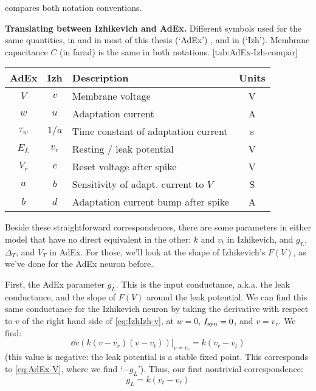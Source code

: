  compares both notation conventions.

\begin{table}[h]
    \begin{sidecaption}
        {\textbf{Translating between Izhikevich and AdEx.}
        Different symbols used for the same quantities, in \cite{Brette2005AdaptiveExponentialIntegrateandFirea} and in most of this thesis (`AdEx') , and in \cite{Izhikevich2007DynamicalSystemsNeuroscience} (`Izh').
        Membrane capacitance $C$ (in farad) is the same in both notations.}
        [tab:AdEx-Izh-compar]
        \begin{tabular}{c c l c}
            AdEx   & Izh  & Description & Units \\
            \hline
            $V$  & $v$   & Membrane voltage & V \\
            $w$  & $u$   & Adaptation current & A \\
            $τ_w$  & $1/a$   & Time constant of adaptation current & s \\
            $E_L$  & $v_r$  & Resting / leak potential & V \\
            $V_r$  & $c$  & Reset voltage after spike & V \\
            $a$  & $b$ & Sensitivity of adapt. current to $V$ & S \\
            $b$  & $d$ & Adaptation current bump after spike & A \\
        \end{tabular}
    \end{sidecaption}
\end{table}

Beside these straightforward correspondences, there are some parameters in either model that have no direct equivalent in the other: $k$ and $v_t$ in Izhikevich, and $g_L$, $Δ_T$, and $V_T$ in AdEx.
For those, we'll look at the shape of Izhikevich's $F(V)$, as we've done for the AdEx neuron before.

First, the AdEx parameter $g_L$. This is the input conductance, a.k.a. the leak conductance, and the slope of $F(V)$ around the leak potential. We can find this same conductance for the Izhikevich neuron by taking the derivative with respect to $v$ of the right hand side of \cref{eq:IzhIzh-v}, at $w = 0$, $I_{\text{syn}} = 0$, and $v = v_r$. We find:
\begin{equation}
    \dd{v}(k(v-v_r)(v-v_t)) \Big|_{v=v_r} = k(v_r - v_t)
\end{equation}
(this value is negative: the leak potential is a stable fixed point. This corresponds to \cref{eq:AdEx-V}, where we find `$-g_L$').
Thus, our first nontrivial correspondence:
\begin{equation}
    g_L = k (v_t - v_r)  \label{eq:leak_conductance}
\end{equation}

